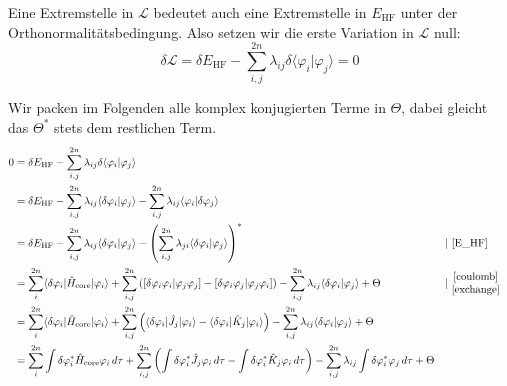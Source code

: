 Eine Extremstelle in $\mathcal{L}$ bedeutet auch eine Extremstelle in $E_\textrm{HF}$
unter der Orthonormalitätsbedingung. Also setzen wir die erste Variation in $\mathcal{L}$ null:
\begin{equation}
  \delta \mathcal{L} = \delta E_\textrm{HF}
  - \sum^{2n}_{i,j} \lambda_{ij} \delta \langle \varphi_i \vert \varphi_j \rangle = 0
\end{equation}

Wir packen im Folgenden alle komplex konjugierten Terme in $\Theta$,
dabei gleicht das $\Theta^*$ stets dem restlichen Term.
\begin{align*}
  0 &= \delta E_\textrm{HF} 
  - \sum^{2n}_{i,j} \lambda_{ij} \delta \langle \varphi_i \vert \varphi_j \rangle\\
  &= \delta E_\textrm{HF}
  - \sum^{2n}_{i,j} \lambda_{ij} \langle \delta \varphi_i \vert \varphi_j \rangle
  - \sum^{2n}_{i,j} \lambda_{ij} \langle \varphi_i \vert \delta \varphi_j \rangle\\
  &= \delta E_\textrm{HF}
  - \sum^{2n}_{i,j} \lambda_{ij} \langle \delta \varphi_i \vert \varphi_j \rangle
  - \left(\sum^{2n}_{i,j} \lambda_{ji} \langle \delta \varphi_i \vert \varphi_j \rangle \right)^*
  &| &\textrm{ \cref{E_HF}}\\
  &=  \sum_i^{2n} \langle \delta \varphi_i \vert \hat{H}_{\text{core}} \vert \varphi_i \rangle
  + \sum_{i, j}^{2n} \left( 
    \left[ \delta \varphi_i \varphi_i \vert \varphi_j\varphi_j \right] 
    - \left[ \delta \varphi_i\varphi_j \vert \varphi_j\varphi_i \right]
  \right) 
  - \sum_{i,j}^{2n} \lambda_{ij} \langle \delta \varphi_i \vert \varphi_j \rangle + \Theta
  &| &\begin{matrix}\textrm{ \cref{coulomb}}\\ \textrm{ \cref{exchange}}\end{matrix}\\
  &=  \sum_i^{2n} \langle \delta \varphi_i \vert \hat{H}_{\text{core}} \vert \varphi_i \rangle
  + \sum_{i, j}^{2n} \left( 
    \langle \delta \varphi_i \vert \hat{J}_j \vert \varphi_i \rangle
    - \langle \delta \varphi_i \vert \hat{K}_j \vert \varphi_i \rangle
  \right) 
  - \sum_{i,j}^{2n} \lambda_{ij} \langle \delta \varphi_i \vert \varphi_j \rangle + \Theta\\
  &=  \sum_i^{2n} \int \delta \varphi_i^* \hat{H}_{\text{core}} \varphi_i \,d\tau
  + \sum_{i, j}^{2n} \left( 
    \int \delta \varphi_i^* \hat{J}_j \varphi_i \,d\tau
    - \int \delta \varphi_i^* \hat{K}_j \varphi_i \,d\tau
  \right) 
  - \sum_{i,j}^{2n} \lambda_{ij} \int \delta \varphi_i^* \varphi_j \,d\tau + \Theta
\end{align*}

